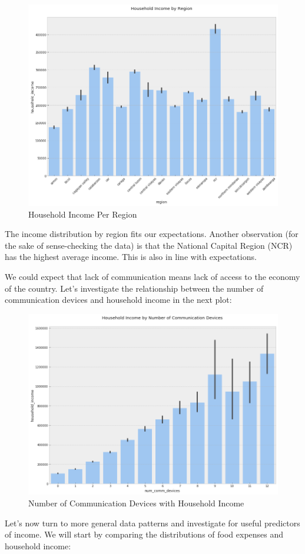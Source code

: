 \documentclass{article}
\begin{document}
\begin{figure}[H]
\caption{Household Income Per Region}
\centering
\includegraphics[width = 0.7 \textwidth]{household_income_region}
\end{figure}

The income distribution by region fits our expectations. Another observation (for the sake of sense-checking the data) is that the National Capital Region (NCR) has the highest average income. This is also in line with expectations.

We could expect that lack of communication means lack of access to the economy of the country. Let's investigate the relationship between the number of communication devices and household income in the next plot:

\begin{figure}[H]
\caption{Number of Communication Devices with Household Income}
\centering
\includegraphics[width = 0.7 \textwidth]{household_income_comm_devices}
\end{figure}

Let's now turn to more general data patterns and investigate for useful predictors of income. We will start by comparing the distributions of food expenses and household income:
\end{document}

